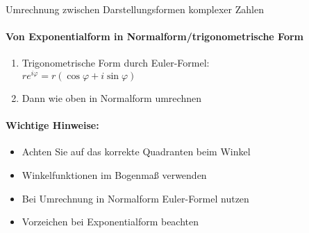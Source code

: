 \begin{KR}{Umrechnung zwischen Darstellungsformen komplexer Zahlen}
\paragraph{Von Exponentialform in Normalform/trigonometrische Form}
\begin{enumerate}
   \item Trigonometrische Form durch Euler-Formel:\\
   $re^{i\varphi} = r(\cos\varphi + i\sin\varphi)$
   \item Dann wie oben in Normalform umrechnen
\end{enumerate}

\paragraph{Wichtige Hinweise:}
\begin{itemize}
   \item Achten Sie auf das korrekte Quadranten beim Winkel
   \item Winkelfunktionen im Bogenmaß verwenden
   \item Bei Umrechnung in Normalform Euler-Formel nutzen
   \item Vorzeichen bei Exponentialform beachten
\end{itemize}
\end{KR}




